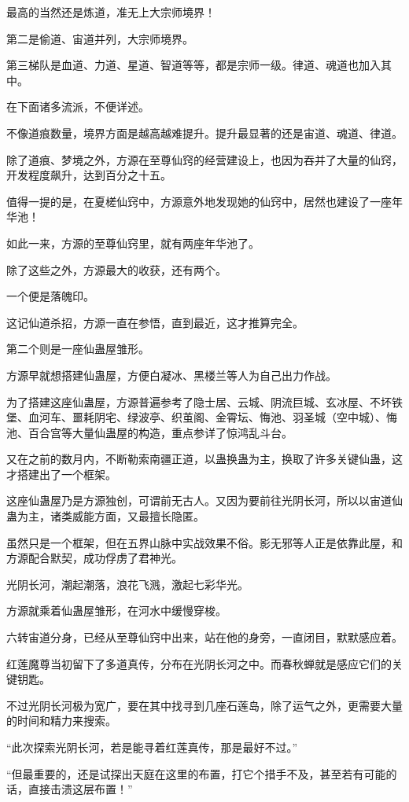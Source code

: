 \begin{this_body}
最高的当然还是炼道，准无上大宗师境界！

第二是偷道、宙道并列，大宗师境界。

第三梯队是血道、力道、星道、智道等等，都是宗师一级。律道、魂道也加入其中。

在下面诸多流派，不便详述。

不像道痕数量，境界方面是越高越难提升。提升最显著的还是宙道、魂道、律道。

除了道痕、梦境之外，方源在至尊仙窍的经营建设上，也因为吞并了大量的仙窍，开发程度飙升，达到百分之十五。

值得一提的是，在夏槎仙窍中，方源意外地发现她的仙窍中，居然也建设了一座年华池！

如此一来，方源的至尊仙窍里，就有两座年华池了。

除了这些之外，方源最大的收获，还有两个。

一个便是落魄印。

这记仙道杀招，方源一直在参悟，直到最近，这才推算完全。

第二个则是一座仙蛊屋雏形。

方源早就想搭建仙蛊屋，方便白凝冰、黑楼兰等人为自己出力作战。

为了搭建这座仙蛊屋，方源普遍参考了隐士居、云城、阴流巨城、玄冰屋、不坏铁堡、血河车、噩耗阴宅、绿波亭、织茧阁、金霄坛、悔池、羽圣城（空中城）、悔池、百合宫等大量仙蛊屋的构造，重点参详了惊鸿乱斗台。

又在之前的数月内，不断勒索南疆正道，以蛊换蛊为主，换取了许多关键仙蛊，这才搭建出了一个框架。

这座仙蛊屋乃是方源独创，可谓前无古人。又因为要前往光阴长河，所以以宙道仙蛊为主，诸类威能方面，又最擅长隐匿。

虽然只是一个框架，但在五界山脉中实战效果不俗。影无邪等人正是依靠此屋，和方源配合默契，成功俘虏了君神光。

光阴长河，潮起潮落，浪花飞溅，激起七彩华光。

方源就乘着仙蛊屋雏形，在河水中缓慢穿梭。

六转宙道分身，已经从至尊仙窍中出来，站在他的身旁，一直闭目，默默感应着。

红莲魔尊当初留下了多道真传，分布在光阴长河之中。而春秋蝉就是感应它们的关键钥匙。

不过光阴长河极为宽广，要在其中找寻到几座石莲岛，除了运气之外，更需要大量的时间和精力来搜索。

“此次探索光阴长河，若是能寻着红莲真传，那是最好不过。”

“但最重要的，还是试探出天庭在这里的布置，打它个措手不及，甚至若有可能的话，直接击溃这层布置！”


\end{this_body}
